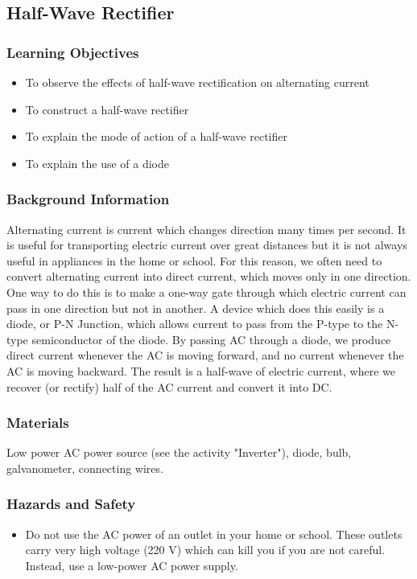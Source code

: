 \subsection{Half-Wave Rectifier}

\subsubsection*{Learning Objectives}
\begin{itemize}
\item{To observe the effects of half-wave rectification on alternating current}
\item{To construct a half-wave rectifier}
\item{To explain the mode of action of a half-wave rectifier}
\item{To explain the use of a diode}
\end{itemize}

\subsubsection*{Background Information}
Alternating current is current which changes direction many times per second.  It is useful for transporting electric current over great distances but it is not always useful in appliances in the home or school.  For this reason, we often need to convert alternating current into direct current, which moves only in one direction.
One way to do this is to make a one-way gate through which electric current can pass in one direction but not in another.  A device which does this easily is a diode, or P-N Junction, which allows current to pass from the P-type to the N-type semiconductor of the diode.  By passing AC through a diode, we produce direct current whenever the AC is moving forward, and no current whenever the AC is moving backward.  The result is a half-wave of electric current, where we recover (or rectify) half of the AC current and convert it into DC.

\subsubsection*{Materials}
Low power AC power source (see the activity "Inverter"), diode, bulb, galvanometer, connecting wires.

\subsubsection*{Hazards and Safety}
\begin{itemize}
\item{Do not use the AC power of an outlet in your home or school.  These outlets carry very high voltage (220 V) which can kill you if you are not careful.  Instead, use a low-power AC power supply.}
\end{itemize}


